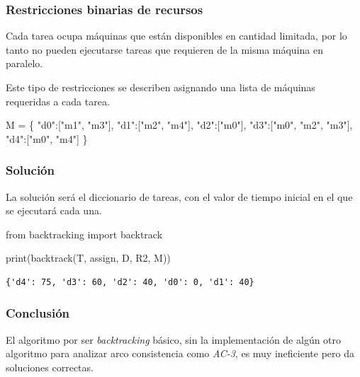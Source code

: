 \documentclass[
]{article}
\newenvironment{Shaded}{}{}
\newcommand{\BuiltInTok}[1]{#1}
\newcommand{\ImportTok}[1]{#1}
\newcommand{\NormalTok}[1]{#1}
\newcommand{\OperatorTok}[1]{\textcolor[rgb]{0.40,0.40,0.40}{#1}}
\newcommand{\StringTok}[1]{\textcolor[rgb]{0.25,0.44,0.63}{#1}}
\begin{document}
\hypertarget{restricciones-binarias-de-recursos}{%
\subsubsection{Restricciones binarias de
recursos}\label{restricciones-binarias-de-recursos}}

Cada tarea ocupa máquinas que están disponibles en cantidad limitada,
por lo tanto no pueden ejecutarse tareas que requieren de la misma
máquina en paralelo.

Este tipo de restricciones se describen asignando una lista de máquinas
requeridas a cada tarea.

\begin{Shaded}
\begin{Highlighting}[]
\NormalTok{M }\OperatorTok{=}\NormalTok{ \{}
    \StringTok{"d0"}\NormalTok{:[}\StringTok{"m1"}\NormalTok{, }\StringTok{"m3"}\NormalTok{],}
    \StringTok{"d1"}\NormalTok{:[}\StringTok{"m2"}\NormalTok{, }\StringTok{"m4"}\NormalTok{],}
    \StringTok{"d2"}\NormalTok{:[}\StringTok{"m0"}\NormalTok{],}
    \StringTok{"d3"}\NormalTok{:[}\StringTok{"m0"}\NormalTok{, }\StringTok{"m2"}\NormalTok{, }\StringTok{"m3"}\NormalTok{],}
    \StringTok{"d4"}\NormalTok{:[}\StringTok{"m0"}\NormalTok{, }\StringTok{"m4"}\NormalTok{]}
\NormalTok{\}}
\end{Highlighting}
\end{Shaded}

\hypertarget{soluciuxf3n}{%
\subsubsection{Solución}\label{soluciuxf3n}}

La solución será el diccionario de tareas, con el valor de tiempo
inicial en el que se ejecutará cada una.

\begin{Shaded}
\begin{Highlighting}[]
\ImportTok{from}\NormalTok{ backtracking }\ImportTok{import}\NormalTok{ backtrack}

\BuiltInTok{print}\NormalTok{(backtrack(T, assign, D, R2, M))}
\end{Highlighting}
\end{Shaded}

\begin{verbatim}
{'d4': 75, 'd3': 60, 'd2': 40, 'd0': 0, 'd1': 40}
\end{verbatim}

\hypertarget{conclusiuxf3n-1}{%
\subsubsection{Conclusión}\label{conclusiuxf3n-1}}

El algoritmo por ser \emph{backtracking} básico, sin la implementación
de algún otro algoritmo para analizar arco consistencia como
\emph{AC-3}, es muy ineficiente pero da soluciones correctas.
\end{document}
